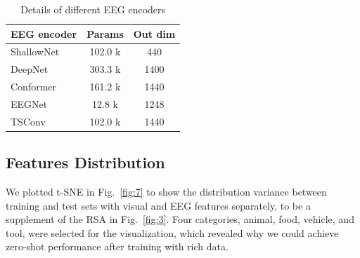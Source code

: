\begin{table}[htpb]
\caption{Details of different EEG encoders}
\label{tab:11}
\small
\centering
\begin{tabular}{lcc}
    \toprule
    EEG encoder & Params & Out dim \\
    \midrule
    ShallowNet & 102.0 k & 440 \\
    DeepNet & 303.3 k & 1400 \\ 
    Conformer & 161.2 k & 1440 \\
    EEGNet & 12.8 k & 1248 \\
    TSConv & 102.0 k & 1440 \\
    \bottomrule 
\end{tabular}
\end{table}

\subsection{Features Distribution}
\label{sec:appendA7}
We plotted t-SNE \cite{maaten2008visualizinga} in Fig.~\ref{fig:7} to show the distribution variance between training and test sets with visual and EEG features separately, to be a supplement of the RSA in Fig.~\ref{fig:3}.
Four categories, animal, food, vehicle, and tool, were selected for the visualization, which revealed why we could achieve zero-shot performance after training with rich data. 
